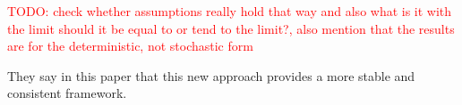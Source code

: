 \textcolor{red}{TODO: check whether assumptions really hold that way and also what is it with the limit should it be equal to or tend to the limit?, also mention that the results are for the deterministic, not stochastic form}

They say in this paper that this new approach provides a more stable and consistent framework. 